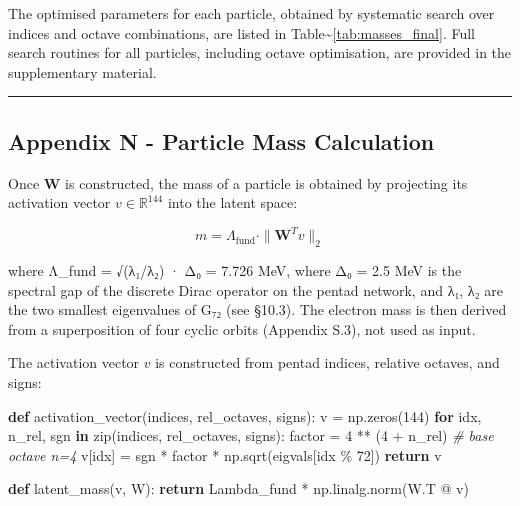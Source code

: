 \documentclass[11pt]{article}
\newenvironment{Shaded}{}{}
\newcommand{\BuiltInTok}[1]{\textcolor[rgb]{0.00,0.50,0.00}{#1}}
\newcommand{\CommentTok}[1]{\textcolor[rgb]{0.38,0.63,0.69}{\textit{#1}}}
\newcommand{\ControlFlowTok}[1]{\textcolor[rgb]{0.00,0.44,0.13}{\textbf{#1}}}
\newcommand{\DecValTok}[1]{\textcolor[rgb]{0.25,0.63,0.44}{#1}}
\newcommand{\KeywordTok}[1]{\textcolor[rgb]{0.00,0.44,0.13}{\textbf{#1}}}
\newcommand{\NormalTok}[1]{#1}
\newcommand{\OperatorTok}[1]{\textcolor[rgb]{0.40,0.40,0.40}{#1}}
\begin{document}
The optimised parameters for each particle, obtained by systematic
search over indices and octave combinations, are listed in
Table\textasciitilde{}\ref{tab:masses_final}. Full search routines for
all particles, including octave optimisation, are provided in the
supplementary material.

\begin{center}\rule{0.5\linewidth}{0.5pt}\end{center}

\hypertarget{appendix-n---particle-mass-calculation}{%
\subsection{Appendix N - Particle Mass
Calculation}\label{appendix-n---particle-mass-calculation}}

Once \(\mathbf{W}\) is constructed, the mass of a particle is obtained
by projecting its activation vector \(v \in \mathbb{R}^{144}\) into the
latent space:

\[
m = \Lambda_{\text{fund}} \cdot \|\mathbf{W}^T v\|_2
\]

where Λ\_fund = √(λ₁/λ₂) · Δ₀ = 7.726 MeV, where Δ₀ = 2.5 MeV is the
spectral gap of the discrete Dirac operator on the pentad network, and
λ₁, λ₂ are the two smallest eigenvalues of G₇₂ (see §10.3). The electron
mass is then derived from a superposition of four cyclic orbits
(Appendix S.3), not used as input.

The activation vector \(v\) is constructed from pentad indices, relative
octaves, and signs:

\begin{Shaded}
\begin{Highlighting}[]
\KeywordTok{def}\NormalTok{ activation\_vector(indices, rel\_octaves, signs):}
\NormalTok{    v }\OperatorTok{=}\NormalTok{ np.zeros(}\DecValTok{144}\NormalTok{)}
    \ControlFlowTok{for}\NormalTok{ idx, n\_rel, sgn }\KeywordTok{in} \BuiltInTok{zip}\NormalTok{(indices, rel\_octaves, signs):}
\NormalTok{        factor }\OperatorTok{=} \DecValTok{4} \OperatorTok{**}\NormalTok{ (}\DecValTok{4} \OperatorTok{+}\NormalTok{ n\_rel)  }\CommentTok{\# base octave n=4}
\NormalTok{        v[idx] }\OperatorTok{=}\NormalTok{ sgn }\OperatorTok{*}\NormalTok{ factor }\OperatorTok{*}\NormalTok{ np.sqrt(eigvals[idx }\OperatorTok{\%} \DecValTok{72}\NormalTok{])}
    \ControlFlowTok{return}\NormalTok{ v}

\KeywordTok{def}\NormalTok{ latent\_mass(v, W):}
    \ControlFlowTok{return}\NormalTok{ Lambda\_fund }\OperatorTok{*}\NormalTok{ np.linalg.norm(W.T }\OperatorTok{@}\NormalTok{ v)}
\end{Highlighting}
\end{Shaded}
\end{document}

